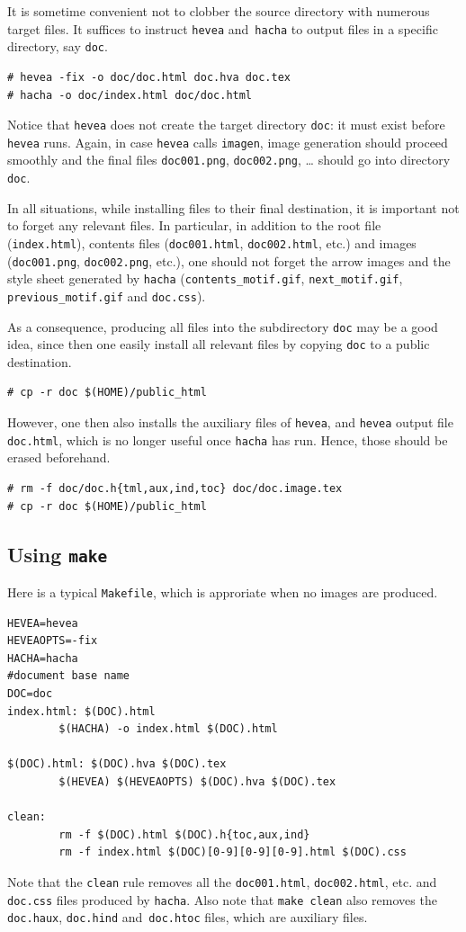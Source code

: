 It is sometime convenient not to clobber the source directory with
numerous target files.
It suffices to instruct
\texttt{hevea} and~\texttt{hacha} to output files in a
specific directory, say \texttt{doc}.
\begin{verbatim}
# hevea -fix -o doc/doc.html doc.hva doc.tex
# hacha -o doc/index.html doc/doc.html
\end{verbatim}
Notice that \texttt{hevea} does not create the target directory
\texttt{doc}: it must exist before \texttt{hevea} runs.
Again, in case \texttt{hevea} calls \texttt{imagen},
image generation should proceed smoothly and the final files
\texttt{doc001.png}, \texttt{doc002.png}, \ldots{} should go into
directory \texttt{doc}.


In all situations, while installing files to their final destination,
it is important not to forget any relevant files.
In particular, in addition to the root file
(\texttt{index.html}), contents files (\texttt{doc001.html},
\texttt{doc002.html}, etc.) and images
(\texttt{doc001.png}, \texttt{doc002.png}, etc.),
one should not forget the arrow images and the
style sheet generated by \texttt{hacha}
(\texttt{contents\_motif.gif}, \texttt{next\_motif.gif},
\texttt{previous\_motif.gif} and \texttt{doc.css}).

As a consequence, producing all files into the subdirectory
\texttt{doc} may be a good idea, since then one easily install all
relevant files by copying \texttt{doc} to a public destination.
\begin{verbatim}
# cp -r doc $(HOME)/public_html
\end{verbatim}
However, one then also installs the auxiliary files of \texttt{hevea},
and \texttt{hevea} output file \texttt{doc.html}, which is no longer
useful once \texttt{hacha} has run.
Hence, those should be erased beforehand.
\begin{verbatim}
# rm -f doc/doc.h{tml,aux,ind,toc} doc/doc.image.tex
# cp -r doc $(HOME)/public_html
\end{verbatim}


\subsection{Using \label{makefile}\texttt{make}}

Here is a typical \texttt{Makefile}, which is approriate when
no images are produced.
\begin{verbatim}
HEVEA=hevea
HEVEAOPTS=-fix
HACHA=hacha
#document base name
DOC=doc
index.html: $(DOC).html
        $(HACHA) -o index.html $(DOC).html

$(DOC).html: $(DOC).hva $(DOC).tex
        $(HEVEA) $(HEVEAOPTS) $(DOC).hva $(DOC).tex

clean:
        rm -f $(DOC).html $(DOC).h{toc,aux,ind}
        rm -f index.html $(DOC)[0-9][0-9][0-9].html $(DOC).css
\end{verbatim}
Note that the \texttt{clean} rule removes all the \texttt{doc001.html},
\texttt{doc002.html}, etc. and \texttt{doc.css} files produced by
\texttt{hacha}.
Also note that \texttt{make clean} also removes the
\texttt{doc.haux}, \texttt{doc.hind} and~\texttt{doc.htoc} files, which are \hevea{}
auxiliary files.

